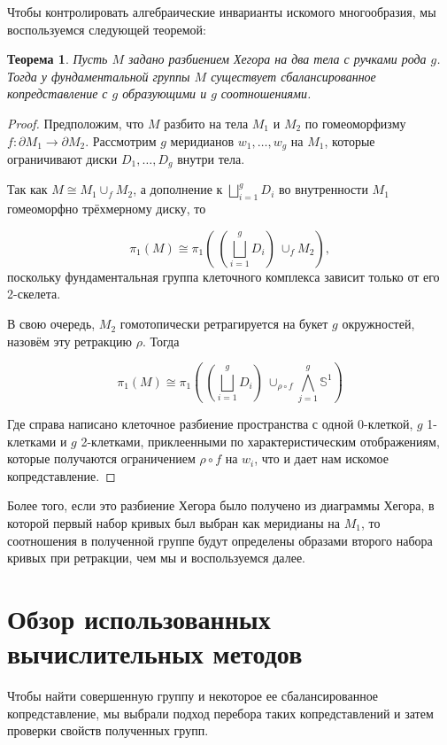 \documentclass[a4paper, 12pt]{article}
\newtheorem*{theorem}{Теорема}
\begin{document}
        Чтобы контролировать алгебраические инварианты искомого многообразия, мы воспользуемся следующей теоремой:

        \begin{theorem} \label{fgroup}
            Пусть $M$ задано разбиением Хегора на два тела с ручками рода $g$. Тогда у фундаментальной группы $M$ существует сбалансированное копредставление с $g$ образующими и $g$ соотношениями.
        \end{theorem}

        \begin{proof}
            Предположим, что $M$ разбито на тела $M_1$ и $M_2$ по гомеоморфизму $f: \partial M_1 \rightarrow \partial M_2$. Рассмотрим $g$ меридианов $w_1, \dots, w_g$ на $M_1$, которые ограничивают диски $D_1, \dots, D_g$ внутри тела.

            Так как $M \cong M_1 \cup_f M_2$, а дополнение к $\bigsqcup_{i = 1}^{g} D_i$ во внутренности $M_1$ гомеоморфно трёхмерному диску, то 

            \[\pi_1(M) \cong \pi_1( ~ (\bigsqcup_{i = 1}^{g} D_i) ~ \cup_f M_2),\] 
            поскольку фундаментальная группа клеточного комплекса зависит только от его 2-скелета.
            
            В свою очередь, $M_2$ гомотопически ретрагируется на букет $g$ окружностей, назовём эту ретракцию $\rho$. Тогда


            \[\pi_1(M) \cong \pi_1( ~ (\bigsqcup_{i = 1}^{g} D_i) ~ \cup_{\rho \circ f} \bigwedge_{j = 1}^{g} \mathbb{S}^1) \]

            Где справа написано клеточное разбиение пространства с одной 0-клеткой, $g$ 1-клетками и $g$ 2-клетками, приклеенными по характеристическим отображениям, которые получаются ограничением $\rho \circ f$ на $w_i$, что и дает нам искомое копредставление. 
            
        \end{proof}
        Более того, если это разбиение Хегора было получено из диаграммы Хегора, в которой первый набор кривых был выбран как меридианы на $M_1$, то соотношения в полученной группе будут определены образами второго набора кривых при ретракции, чем мы и воспользуемся далее.

\section{Обзор использованных вычислительных методов}     
    Чтобы найти совершенную группу и некоторое ее сбалансированное копредставление, мы выбрали подход перебора таких копредставлений и затем проверки свойств полученных групп.
\end{document}
